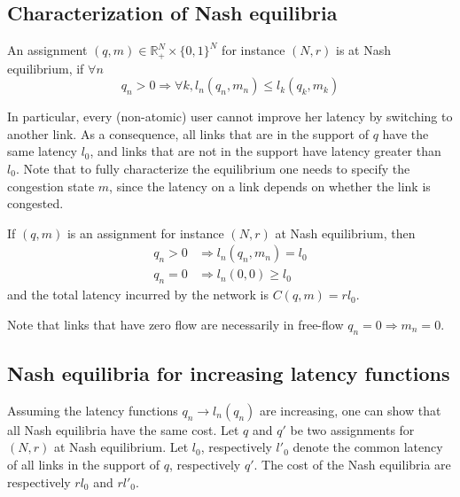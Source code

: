 \subsection{Characterization of Nash equilibria}

\begin{definition}
An assignment $(q, m) \in \mathbb{R}_+^N \times \{0, 1\}^N$ for instance $(N, r)$ is at Nash equilibrium, if $\forall n$
\[
q_n > 0 \Rightarrow \forall k, l_n(q_n, m_n) \leq l_k(q_k, m_k)
\]
\end{definition}

In particular, every (non-atomic) user cannot improve her latency by switching to another link. As a consequence, all links that are in the support of $q$ have the same latency $l_0$, and links that are not in the support have latency greater than $l_0$. Note that to fully characterize the equilibrium one needs to specify the congestion state $m$, since the latency on a link depends on whether the link is congested.

\begin{lemma}
\label{lemma:nash_eq}
If $(q, m)$ is an assignment for instance $(N, r)$ at Nash equilibrium, then
\begin{align*}
q_n >0 &\Rightarrow l_n(q_n, m_n) = l_0\\
q_n = 0 &\Rightarrow l_n(0, 0) \geq l_0
\end{align*}
and the total latency incurred by the network is $C(q, m) = r l_0$.
\end{lemma}

Note that links that have zero flow are necessarily in free-flow $q_n = 0 \Rightarrow m_n = 0$.

\subsection{Nash equilibria for increasing latency functions}
Assuming the latency functions $q_n \rightarrow l_n(q_n)$ are increasing, one can show that all Nash equilibria have the same cost. Let $q$ and $q'$ be two assignments for $(N, r)$ at Nash equilibrium.  Let $l_0$, respectively $l'_0$ denote the common latency of all links in the support of $q$, respectively $q'$. The cost of the Nash equilibria are respectively $rl_0$ and $rl'_0$.

